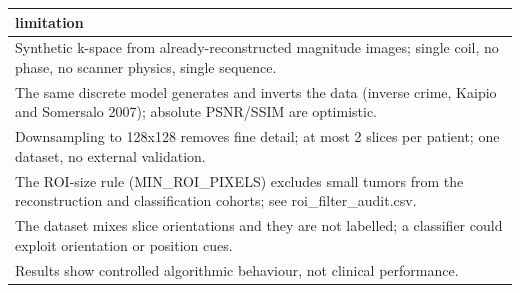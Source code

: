 \begin{tabular}{l}
\hline
limitation \\
\hline
Synthetic k-space from already-reconstructed magnitude images; single coil, no phase, no scanner physics, single sequence. \\
The same discrete model generates and inverts the data (inverse crime, Kaipio and Somersalo 2007); absolute PSNR/SSIM are optimistic. \\
Downsampling to 128x128 removes fine detail; at most 2 slices per patient; one dataset, no external validation. \\
The ROI-size rule (MIN\_ROI\_PIXELS) excludes small tumors from the reconstruction and classification cohorts; see roi\_filter\_audit.csv. \\
The dataset mixes slice orientations and they are not labelled; a classifier could exploit orientation or position cues. \\
Results show controlled algorithmic behaviour, not clinical performance. \\
\hline
\end{tabular}
